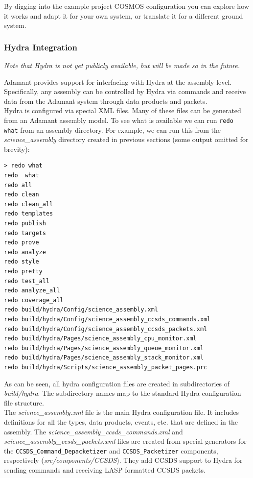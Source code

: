 By digging into the example project COSMOS configuration you can explore how it works and adapt it for your own system, or translate it for a different ground system.

\subsubsection{Hydra Integration}

\textit{Note that Hydra is not yet publicly available, but will be made so in the future.}

Adamant provides support for interfacing with Hydra at the assembly level. Specifically, any assembly can be controlled by Hydra via commands and receive data from the Adamant system through data products and packets. \\

Hydra is configured via special XML files. Many of these files can be generated from an Adamant assembly model. To see what is available we can run \texttt{redo what} from an assembly directory. For example, we can run this from the \textit{science\_assembly} directory created in previous sections (some output omitted for brevity):

\vspace{5mm} %
\begin{verbatim}
> redo what
redo  what
redo all
redo clean
redo clean_all
redo templates
redo publish
redo targets
redo prove
redo analyze
redo style
redo pretty
redo test_all
redo analyze_all
redo coverage_all
redo build/hydra/Config/science_assembly.xml
redo build/hydra/Config/science_assembly_ccsds_commands.xml
redo build/hydra/Config/science_assembly_ccsds_packets.xml
redo build/hydra/Pages/science_assembly_cpu_monitor.xml
redo build/hydra/Pages/science_assembly_queue_monitor.xml
redo build/hydra/Pages/science_assembly_stack_monitor.xml
redo build/hydra/Scripts/science_assembly_packet_pages.prc
\end{verbatim}
\vspace{5mm} %

As can be seen, all hydra configuration files are created in subdirectories of \textit{build/hydra}. The subdirectory names map to the standard Hydra configuration file structure. \\

The \textit{science\_assembly.xml} file is the main Hydra configuration file. It includes definitions for all the types, data products, events, etc. that are defined in the assembly. The \textit{science\_assembly\_ccsds\_commands.xml} and \textit{science\_assembly\_ccsds\_packets.xml} files are created from special generators for the \texttt{CCSDS\_Command\_Depacketizer} and \texttt{CCSDS\_Packetizer} components, respectively (\textit{src/components/CCSDS}). They add CCSDS support to Hydra for sending commands and receiving LASP formatted CCSDS packets. \\

